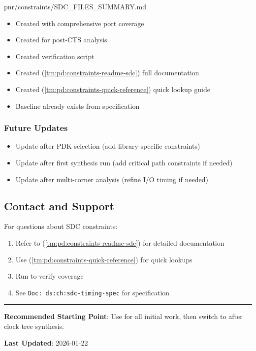 \begin{relocated}{pnr/constraints/SDC_FILES_SUMMARY.md}
\begin{itemize}
\tightlist
\item
  Created  with comprehensive port
  coverage
\item
  Created  for post-CTS analysis
\item
  Created  verification script
\item
  Created  (\cref{tm:pd:constraints-readme-sdc}) full documentation
\item
  Created  (\cref{tm:pd:constraints-quick-reference}) quick lookup guide
\item
  Baseline  already exists from specification
\end{itemize}

\subsubsection{Future Updates}\label{tm:pd:constraints-sdc-files-summary:future-updates}

\begin{itemize}
\tightlist
\item
  Update after PDK selection (add library-specific constraints)
\item
  Update after first synthesis run (add critical path constraints if
  needed)
\item
  Update after multi-corner analysis (refine I/O timing if needed)
\end{itemize}

\subsection{Contact and Support}\label{tm:pd:constraints-sdc-files-summary:contact-and-support}

For questions about SDC constraints:

\begin{enumerate}
\def\labelenumi{\arabic{enumi}.}
\tightlist
\item
  Refer to  (\cref{tm:pd:constraints-readme-sdc}) for detailed documentation
\item
  Use  (\cref{tm:pd:constraints-quick-reference}) for quick lookups
\item
  Run  to verify coverage
\item
  See
  \texttt{Doc:\allowbreak{}\ ds:\allowbreak{}ch:\allowbreak{}sdc-\allowbreak{}timing-\allowbreak{}spec}
  for specification
\end{enumerate}

\begin{center}\rule{0.5\linewidth}{0.5pt}\end{center}

\textbf{Recommended Starting Point}: Use 
for all initial work, then switch to 
after clock tree synthesis.

\textbf{Last Updated}: 2026-01-22
\end{relocated}

